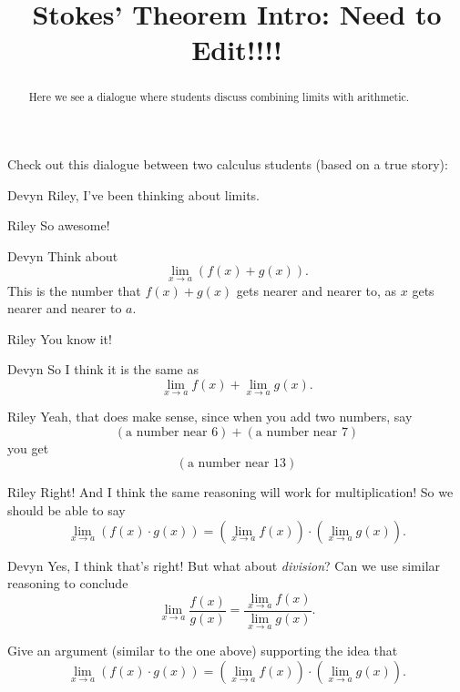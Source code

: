 \documentclass{ximera}
\title[Break-Ground:]{Stokes' Theorem Intro: Need to Edit!!!!}
\begin{document}
\begin{abstract}
Here we see a dialogue where students discuss combining limits with
arithmetic.
\end{abstract}
\maketitle


Check out this dialogue between two calculus students (based on a true
story):

\begin{dialogue}
\item[Devyn] Riley, I've been thinking about limits.
\item[Riley] So awesome!
\item[Devyn] Think about
  \[
  \displaystyle\lim_{x\to a} \left(f(x) + g(x)\right).
  \]
  This is the number that $f(x) + g(x)$ gets nearer and nearer to, as $x$ gets nearer and nearer to $a$. 
\item[Riley] You know it!
\item[Devyn] So I think it is the same as
  \[
  \displaystyle\lim_{x\to a} f(x) + \displaystyle\lim_{x\to a}g(x).
  \]
\item[Riley] Yeah, that does make sense, since when you add two
  numbers, say
  \[
  (\text{a number near $6$}) + (\text{a number near $7$})
  \]
  you get
  \[
  (\text{a number near $13$})
  \]
\item[Riley] Right! And I think the same reasoning will work for
  multiplication! So we should be able to say
  \[
  \displaystyle\lim_{x\to a}\left(f(x) \cdot g(x)\right) = \left(\displaystyle\lim_{x\to a} f(x) \right)\cdot\left(\displaystyle\lim_{x\to a} g(x)\right).
  \]
\item[Devyn] Yes, I think that's right! But what about
  \textit{division}? Can we use similar reasoning to conclude
  \[
  \displaystyle\lim_{x\to a} \frac{f(x)}{g(x)} = \frac{\displaystyle\lim_{x\to a}
    f(x)}{\displaystyle\lim_{x\to a} g(x)}.
  \]
\end{dialogue}



\begin{problem}
  Give an argument (similar to the one above) supporting the idea that
  \[
  \displaystyle\lim_{x\to a}\left(f(x) \cdot g(x)\right) = \left(\displaystyle\lim_{x\to a} f(x) \right)\cdot\left(\displaystyle\lim_{x\to a} g(x)\right).
  \]
  \begin{freeResponse}
  \end{freeResponse}
\end{problem}
\end{document}
